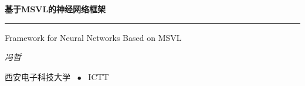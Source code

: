 \documentclass[UTF-8]{progbookcn}
\begin{document}
\begin{titlepage}
  \vspace*{25ex}

  \hspace{0.05\textwidth}\begin{minipage}{.9\textwidth}
    \flushright

    {\textbf{基于MSVL的神经网络框架}}

    \rule{\linewidth}{.5pt}

    \vspace{2ex}

    {\textsf{Framework for Neural Networks Based on MSVL}} \\

    \vspace{20ex}

    {\textit{冯哲}}~~~~~~~~~~~~~~~~~~~

  \end{minipage}

  \vfill

  \centering
  { \textsf{西安电子科技大学} ~$\bullet$~ \textsf{ICTT}}
\end{titlepage}
\thispagestyle{empty}


\frontmatter


%
%
%
\end{document}
